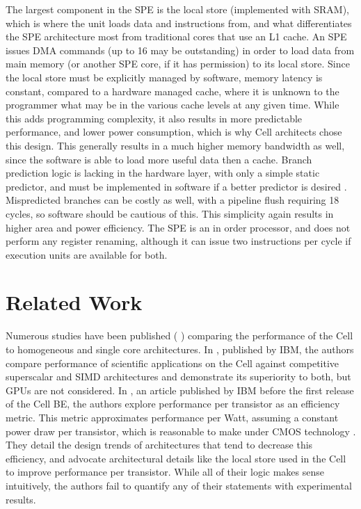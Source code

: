 \documentclass{sig-alternate-05-2015}
\begin{document}
The largest component in the SPE is the local store (implemented with SRAM), which is where the unit loads data and instructions from, and what differentiates the SPE architecture most from traditional cores that use an L1 cache. An SPE issues DMA commands (up to 16 may be outstanding) in order to load data from main memory (or another SPE core, if it has permission) to its local store. Since the local store must be explicitly managed by software, memory latency is constant, compared to a hardware managed cache, where it is unknown to the programmer what may be in the various cache levels at any given time. While this adds programming complexity, it also results in more predictable performance, and lower power consumption, which is why Cell architects chose this design. This generally results in a much higher memory bandwidth as well, since the software is able to load more useful data then a cache. Branch prediction logic is lacking in the hardware layer, with only a simple static predictor, and must be implemented in software if a better predictor is desired \cite{flachs2006microarchitecture}. Mispredicted branches can be costly as well, with a pipeline flush requiring 18 cycles, so software should be cautious of this. This simplicity again results in higher area and power efficiency. The SPE is an in order processor, and does not perform any register renaming, although it can issue two instructions per cycle if execution units are available for both.

\section{Related Work}

Numerous studies have been published (\cite{buttari2007limitations} \cite{kurzak2008playstation} \cite{williams2006potential}) comparing the performance of the Cell to homogeneous and single core architectures. In \cite{chen2007cell}, published by IBM, the authors compare performance of scientific applications on the Cell against competitive superscalar and SIMD architectures and demonstrate its superiority to both, but GPUs are not considered.
In \cite{hofstee2005power}, an article published by IBM before the first release of the Cell BE, the authors explore performance per transistor as an efficiency metric. This metric approximates performance per Watt, assuming a constant power draw per transistor, which is reasonable to make under CMOS technology \cite{hofstee2005power}. They detail the design trends of architectures that tend to decrease this efficiency, and advocate architectural details like the local store used in the Cell to improve performance per transistor. While all of their logic makes sense intuitively, the authors fail to quantify any of their statements with experimental results.
\end{document}

